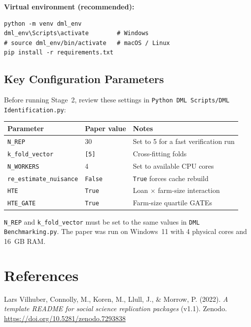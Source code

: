 \documentclass[11pt]{article}
\begin{document}
\begin{notebox}
\textbf{Virtual environment (recommended):}
\begin{lstlisting}
python -m venv dml_env
dml_env\Scripts\activate        # Windows
# source dml_env/bin/activate   # macOS / Linux
pip install -r requirements.txt
\end{lstlisting}
\end{notebox}

\subsection{Key Configuration Parameters}

Before running Stage~2, review these settings in
\texttt{Python DML Scripts/DML Identification.py}:

\begin{table}[h!]
\centering
\begin{tabular}{@{}llp{}@{}}
\toprule
Parameter & Paper value & Notes \\
\midrule
\texttt{N\_REP}               & 30           & Set to 5 for a fast verification run \\
\texttt{k\_fold\_vector}      & \texttt{[5]} & Cross-fitting folds \\
\texttt{N\_WORKERS}           & 4            & Set to available CPU cores \\
\texttt{re\_estimate\_nuisance} & \texttt{False} & \texttt{True} forces cache rebuild \\
\texttt{HTE}                  & \texttt{True}  & Loan $\times$ farm-size interaction \\
\texttt{HTE\_GATE}            & \texttt{True}  & Farm-size quartile GATEs \\
\bottomrule
\end{tabular}
\end{table}

\texttt{N\_REP} and \texttt{k\_fold\_vector} must be set to the same values
in \texttt{DML Benchmarking.py}. The paper was run on Windows~11 with 4
physical cores and 16~GB RAM.

\section{References}

Lars Vilhuber, Connolly, M., Koren, M., Llull, J., \& Morrow, P. (2022).
\textit{A template README for social science replication packages} (v1.1).
Zenodo. \url{https://doi.org/10.5281/zenodo.7293838}
\end{document}

